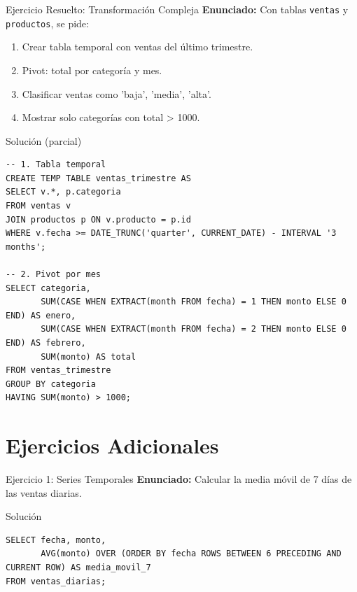 \documentclass[aspectratio=169, 10pt, xcolor=table]{beamer}
\begin{document}
\begin{frame}[fragile]{Ejercicio Resuelto: Transformación Compleja}
    \textbf{Enunciado:} Con tablas \texttt{ventas} y \texttt{productos}, se pide:
    \begin{enumerate}
        \item Crear tabla temporal con ventas del último trimestre.
        \item Pivot: total por categoría y mes.
        \item Clasificar ventas como 'baja', 'media', 'alta'.
        \item Mostrar solo categorías con total > 1000.
    \end{enumerate}
    \begin{block}{Solución (parcial)}
        \begin{lstlisting}
-- 1. Tabla temporal
CREATE TEMP TABLE ventas_trimestre AS
SELECT v.*, p.categoria
FROM ventas v
JOIN productos p ON v.producto = p.id
WHERE v.fecha >= DATE_TRUNC('quarter', CURRENT_DATE) - INTERVAL '3 months';

-- 2. Pivot por mes
SELECT categoria,
       SUM(CASE WHEN EXTRACT(month FROM fecha) = 1 THEN monto ELSE 0 END) AS enero,
       SUM(CASE WHEN EXTRACT(month FROM fecha) = 2 THEN monto ELSE 0 END) AS febrero,
       SUM(monto) AS total
FROM ventas_trimestre
GROUP BY categoria
HAVING SUM(monto) > 1000;
        \end{lstlisting}
    \end{block}
\end{frame}

\section{Ejercicios Adicionales}

\begin{frame}[fragile]{Ejercicio 1: Series Temporales}
    \textbf{Enunciado:} Calcular la media móvil de 7 días de las ventas diarias.
    \begin{block}{Solución}
        \begin{lstlisting}
SELECT fecha, monto,
       AVG(monto) OVER (ORDER BY fecha ROWS BETWEEN 6 PRECEDING AND CURRENT ROW) AS media_movil_7
FROM ventas_diarias;
        \end{lstlisting}
    \end{block}
\end{frame}
\end{document}

